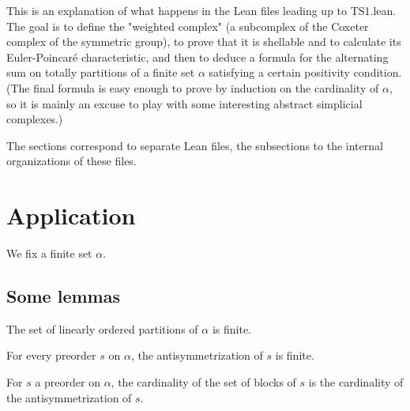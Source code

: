



This is an explanation of what happens in the Lean files leading up to TS1.lean. The goal is to define the "weighted complex" (a subcomplex of the Coxeter complex of the
symmetric group), to prove that it is shellable and to calculate its Euler-Poincaré characteristic, and then to deduce a formula for the alternating sum on totally partitions
of a finite set $\alpha$ satisfying a certain positivity condition. (The final formula is easy enough to prove by induction on the cardinality of $\alpha$, so it is mainly
an excuse to play with some interesting abstract simplicial complexes.)


The sections correspond to separate Lean files, the subsections to the
internal organizations of these files.















\section{Application}

We fix a finite set $\alpha$.

\subsection{Some lemmas}

\begin{subdefi}[fintypeLinearOrderedPartitions]
The set of linearly ordered partitions of $\alpha$ is finite.

\end{subdefi}

\begin{subdefi}[fintypeAntisymmetrization]
For every preorder $s$ on $\alpha$, the antisymmetrization of $s$ is finite.

\end{subdefi}

\begin{subdefi}[CardBlocksPartition]
For $s$ a preorder on $\alpha$, the cardinality of the set of blocks of $s$ is the cardinality of the antisymmetrization of $s$.

\end{subdefi}

